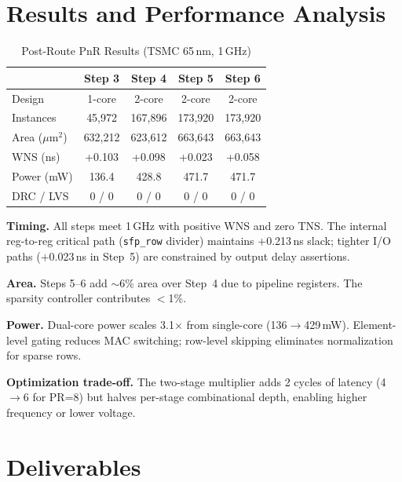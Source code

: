 \documentclass[10pt,twocolumn]{article}
\begin{document}
\section{Results and Performance Analysis}

\begin{table}[H]
\centering
\caption{Post-Route PnR Results (TSMC 65\,nm, 1\,GHz)}
\label{tab:results}
\small
\begin{tabular}{lcccc}
\toprule
& \textbf{Step 3} & \textbf{Step 4} &
  \textbf{Step 5} & \textbf{Step 6} \\
\midrule
Design & 1-core & 2-core & 2-core & 2-core \\
Instances & 45,972 & 167,896 & 173,920 & 173,920 \\
Area ($\mu$m$^2$) & 632,212 & 623,612 & 663,643 & 663,643 \\
WNS (ns) & +0.103 & +0.098 & +0.023 & +0.058 \\
Power (mW) & 136.4 & 428.8 & 471.7 & 471.7 \\
DRC / LVS & 0 / 0 & 0 / 0 & 0 / 0 & 0 / 0 \\
\bottomrule
\end{tabular}
\end{table}

\textbf{Timing.} All steps meet 1\,GHz with positive WNS and zero
TNS. The internal reg-to-reg critical path (\texttt{sfp\_row}
divider) maintains +0.213\,ns slack; tighter I/O paths
(+0.023\,ns in Step~5) are constrained by output delay assertions.

\textbf{Area.} Steps 5--6 add $\sim$6\% area over Step~4 due to
pipeline registers. The sparsity controller contributes $<$1\%.

\textbf{Power.} Dual-core power scales 3.1$\times$ from single-core
(136$\to$429\,mW). Element-level gating reduces MAC switching;
row-level skipping eliminates normalization for sparse rows.

\textbf{Optimization trade-off.} The two-stage multiplier adds
2 cycles of latency (4$\to$6 for PR=8) but halves per-stage
combinational depth, enabling higher frequency or lower voltage.

\section{Deliverables}
\end{document}
